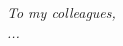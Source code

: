 \documentclass[../../main.tex]{subfiles}
\begin{document}
\mbox{}\par 
\vspace{4.5cm}

\begin{flushright}
    \textit{To my colleagues, \\ \medskip
    ...}
\end{flushright}
\end{document}
